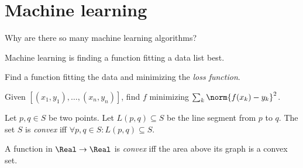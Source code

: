 \chapter{Machine learning}

Why are there so many machine learning algorithms?

Machine learning is finding a function
fitting a data list best.

Find a function fitting the data and minimizing the
%
\emph{loss function}.

Given \([(x_1,y_1),\ldots,(x_n,y_n)]\),
find \(f\) minimizing \(\sum_k \norm{f(x_k) - y_k}^2\).

Let \(p, q \in S\) be two points.
Let \(L(p,q) \subseteq S\) be the line segment from \(p\) to \(q\).
The set \(S\) is
%
\emph{convex} iff \(\forall p,q \in S : L(p,q) \subseteq S\).

A function in \(\Real \to \Real\) is
%
\emph{convex}
iff the area above its graph is a convex set.
